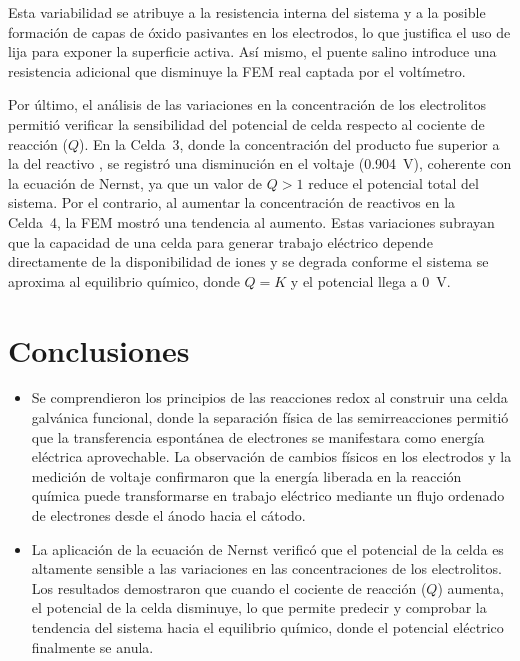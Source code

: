\documentclass[12pt]{article}
\begin{document}
Esta variabilidad se atribuye a la resistencia interna del sistema y a la
posible formación de capas de óxido pasivantes en los electrodos, lo que
justifica el uso de lija para exponer la superficie activa. Así mismo, el
puente salino introduce una resistencia adicional que disminuye la FEM real
captada por el voltímetro.

Por último, el análisis de las variaciones en la concentración de los
electrolitos permitió verificar la sensibilidad del potencial de celda respecto
al cociente de reacción ($Q$). En la Celda~3, donde la concentración del
producto  fue superior a la del reactivo , se registró
una disminución en el voltaje (0.904~V), coherente con la ecuación de Nernst,
ya que un valor de $Q > 1$ reduce el potencial total del sistema. Por el
contrario, al aumentar la concentración de reactivos en la Celda~4, la FEM
mostró una tendencia al aumento. Estas variaciones subrayan que la capacidad
de una celda para generar trabajo eléctrico depende directamente de la
disponibilidad de iones y se degrada conforme el sistema se aproxima al
equilibrio químico, donde $Q = K$ y el potencial llega a 0~V.

\section{Conclusiones}

\begin{itemize}
    \item Se comprendieron los principios de las reacciones redox al construir
          una celda galvánica funcional, donde la separación física de las
          semirreacciones permitió que la transferencia espontánea de
          electrones se manifestara como energía eléctrica aprovechable. La
          observación de cambios físicos en los electrodos y la medición de
          voltaje confirmaron que la energía liberada en la reacción química
          puede transformarse en trabajo eléctrico mediante un flujo ordenado
          de electrones desde el ánodo hacia el cátodo.

    \item La aplicación de la ecuación de Nernst verificó que el potencial de
          la celda es altamente sensible a las variaciones en las
          concentraciones de los electrolitos. Los resultados demostraron que
          cuando el cociente de reacción ($Q$) aumenta, el potencial de la
          celda disminuye, lo que permite predecir y comprobar la tendencia
          del sistema hacia el equilibrio químico, donde el potencial
          eléctrico finalmente se anula.
\end{itemize}
\end{document}
